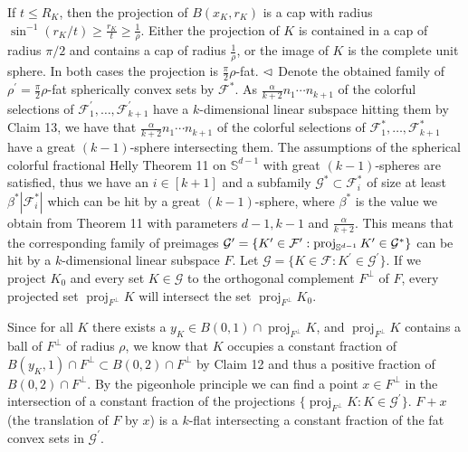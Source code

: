 If $t\leq R_{K}$, then the projection of $B(x_{K},r_{K})$ is a cap with radius $\sin^{-1}(r_{K}/t)\geq\frac{r_{K}}{t}\geq\frac{1}{\rho}$. Either the projection of $K$ is contained in a cap of radius $\pi/2$ and contains a cap of radius $\frac{1}{\rho}$, or the image of $K$ is the complete unit sphere. In both cases the projection is $\frac{\pi}{2}\rho$-fat. $\hfill\vartriangleleft$ Denote the obtained family of $\rho^{\prime}=\frac{\pi}{2}\rho$-fat spherically convex sets by $\mathcal{F}^{*}$. As $\frac{\alpha}{k+2}n_{1}\cdots n_{k+1}$ of the colorful selections of $\mathcal{F}_{1}^{\prime},\ldots,\mathcal{F}_{k+1}^{\prime}$ have a $k$-dimensional linear subspace hitting them by Claim 13, we have that $\frac{\alpha}{k+2}n_{1}\cdots n_{k+1}$ of the colorful selections of $\mathcal{F}_{1}^{*},\ldots,\mathcal{F}_{k+1}^{*}$ have a great $(k-1)$-sphere intersecting them. The assumptions of the spherical colorful fractional Helly Theorem 11 on $\mathbb{S}^{d-1}$ with great $(k-1)$-spheres are satisfied, thus we have an $i\in[k+1]$ and a subfamily $\mathcal{G}^{*}\subset\mathcal{F}_{i}^{*}$ of size at least $\beta^{*}|\mathcal{F}_{i}^{*}|$ which can be hit by a great $(k-1)$-sphere, where $\beta^{*}$ is the value we obtain from Theorem 11 with parameters $d-1,k-1$ and $\frac{\alpha}{k+2}$. This means that the corresponding family of preimages $\mathcal{G}^{\prime}=\{K^{\prime}\in\mathcal{F}^{\prime}:\operatorname{proj}_{%
\mathbb{S}^{d-1}}K^{\prime}\in\mathcal{G}^{*}\}$ can be hit by a $k$-dimensional linear subspace $F$. Let $\mathcal{G}=\{K\in\mathcal{F}:K^{\prime}\in\mathcal{G}^{\prime}\}$. If we project $K_{0}$ and every set $K\in\mathcal{G}$ to the orthogonal complement $F^{\perp}$ of $F$, every projected set $\operatorname{proj}_{F^{\perp}}K$ will intersect the set $\operatorname{proj}_{F^{\perp}}K_{0}$.
\par
\par
Since for all $K$ there exists a $y_{K}\in B(0,1)\cap\operatorname{proj}_{F^{\perp}}K$, and $\operatorname{proj}_{F^{\perp}}K$ contains a ball of $F^{\perp}$ of radius $\rho$, we know that $K$ occupies a constant fraction of $B(y_{K},1)\cap F^{\perp}\subset B(0,2)\cap F^{\perp}$ by Claim 12 and thus a positive fraction of $B(0,2)\cap F^{\perp}$. By the pigeonhole principle we can find a point $x\in F^{\perp}$ in the intersection of a constant fraction of the projections $\{\operatorname{proj}_{F^{\perp}}K:K\in\mathcal{G}^{\prime}\}$. $F+x$ (the translation of $F$ by $x$) is a $k$-flat intersecting a constant fraction of the fat convex sets in $\mathcal{G}^{\prime}$.
